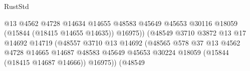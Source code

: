\begin{lexlean}{RustStd}
\begin{coremodule}
                                                            @13
                                                            @4562
                                                            @4728
                                                            @14634
                                                            @14655
                                                            @48583
                                                            @45649
                                                            @45653
                                                            @30116
                                                            @18059
                                                            (@15844 (@18415 @14655 @14635))
                                                            @16975))
                                                        (@48549
                                                          @3710
                                                          @3872
                                                          @13
                                                          @17
                                                          @14692
                                                          @14719
                                                          (@48557
                                                            @3710
                                                            @13
                                                            @14692
                                                            (@48565
                                                              @578
                                                              @37
                                                              @13
                                                              @4562
                                                              @4728
                                                              @14665
                                                              @14687
                                                              @48583
                                                              @45649
                                                              @45653
                                                              @30224
                                                              @18059
                                                              (@15844 (@18415 @14687 @14666))
                                                              @16975))
                                                          (@48549

\end{coremodule}
\end{lexlean}
